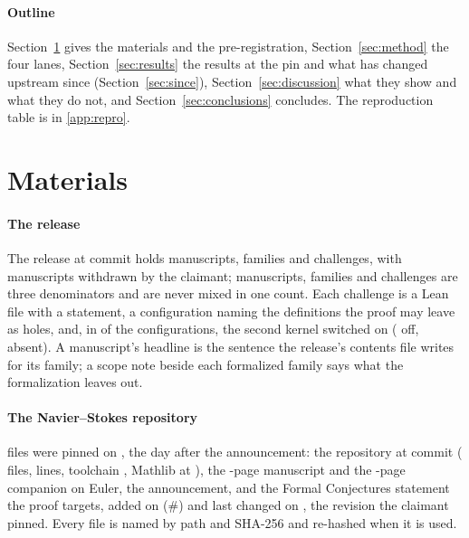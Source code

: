 \documentclass[preprint,11pt,authoryear,a4paper]{elsarticle}
\begin{document}
\paragraph{Outline} Section~\ref{sec:materials} gives the materials and the pre-registration, Section~\ref{sec:method} the four lanes, Section~\ref{sec:results} the results at the pin and what has changed upstream since (Section~\ref{sec:since}), Section~\ref{sec:discussion} what they show and what they do not, and Section~\ref{sec:conclusions} concludes. The reproduction table is in \ref{app:repro}.

\section{Materials}\label{sec:materials}

\paragraph{The release} The release at commit \MtOaCommit{} holds \OmDenManuscripts{} manuscripts, \OmDenFamilies{} families and \OmDenChallenges{} challenges, with \OmWithdrawn{} manuscripts withdrawn by the claimant; manuscripts, families and challenges are three denominators and are never mixed in one count. Each challenge is a Lean file with a statement, a configuration naming the definitions the proof may leave as holes, and, in \OmNanodaInRelease{} of the \MtOaChallenges{} configurations, the second kernel switched on (\OmNanodaOff{} off, \OmNanodaAbsent{} absent). A manuscript's headline is the sentence the release's contents file writes for its family; a scope note beside each formalized family says what the formalization leaves out.

\paragraph{The Navier--Stokes repository} \MtNsFiles{} files were pinned on \MtNsFetched, the day after the announcement: the repository at commit \NsCommit{} (\MtNsLeanFiles{} files, \MtNsLeanLines{} lines, toolchain \LeanToolchain, Mathlib at \MathlibRev), the \PaperPages-page manuscript and the \EulerPages-page companion on Euler, the announcement, and the Formal Conjectures statement the proof targets, added on \FormalConjAdded{} (\#\FormalConjPR) and last changed on \FormalConjTouched, the revision the claimant pinned. Every file is named by path and SHA-256 and re-hashed when it is used.
\end{document}
